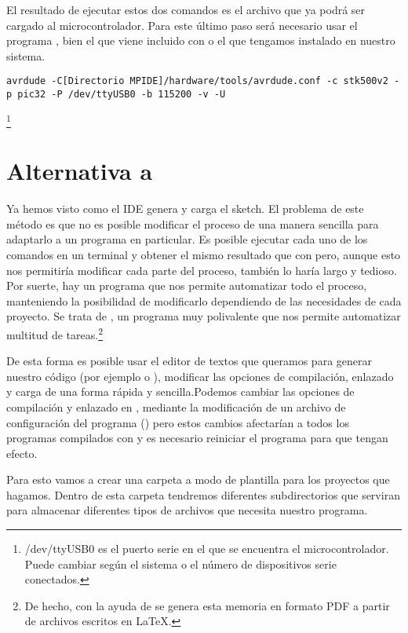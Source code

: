 El resultado de ejecutar estos dos comandos es el archivo  que ya podrá ser cargado al microcontrolador.
Para este último paso será necesario usar el programa , bien el que viene incluido con  o el que tengamos instalado en nuestro sistema.
\begin{lstlisting}[breaklines=true]
avrdude -C[Directorio MPIDE]/hardware/tools/avrdude.conf -c stk500v2 -p pic32 -P /dev/ttyUSB0 -b 115200 -v -U
\end{lstlisting}\protect\footnote{/dev/ttyUSB0 es el puerto serie en el que se encuentra el microcontrolador. Puede cambiar según el sistema o el número de dispositivos serie conectados.}

\section{Alternativa a }

Ya hemos visto como el IDE genera y carga el sketch. El problema de este método es que no es posible modificar el proceso de una manera sencilla para adaptarlo a un programa en particular. Es posible ejecutar cada uno de los comandos en un terminal y obtener el mismo resultado que con  pero, aunque esto nos permitiría modificar cada parte del proceso, también lo haría largo y tedioso. Por suerte, hay un programa que nos permite automatizar todo el proceso, manteniendo la posibilidad de modificarlo dependiendo de las necesidades de cada proyecto. Se trata de , un programa muy polivalente que nos permite automatizar multitud de tareas.\footnote{De hecho, con la ayuda de  se genera esta memoria en formato PDF a partir de archivos escritos en \LaTeX.}

De esta forma es posible usar el editor de textos que queramos para generar nuestro código (por ejemplo  o ), modificar las opciones de compilación, enlazado y carga de una forma rápida y sencilla.Podemos cambiar las opciones de compilación y enlazado en , mediante la  modificación de un archivo de configuración del programa () pero estos cambios afectarían a todos los programas compilados con  y es necesario reiniciar el programa para que tengan efecto. 

Para esto vamos a crear una carpeta a modo de plantilla para los proyectos que hagamos. Dentro de esta carpeta tendremos diferentes subdirectorios que serviran para almacenar diferentes tipos de archivos que necesita nuestro programa.

